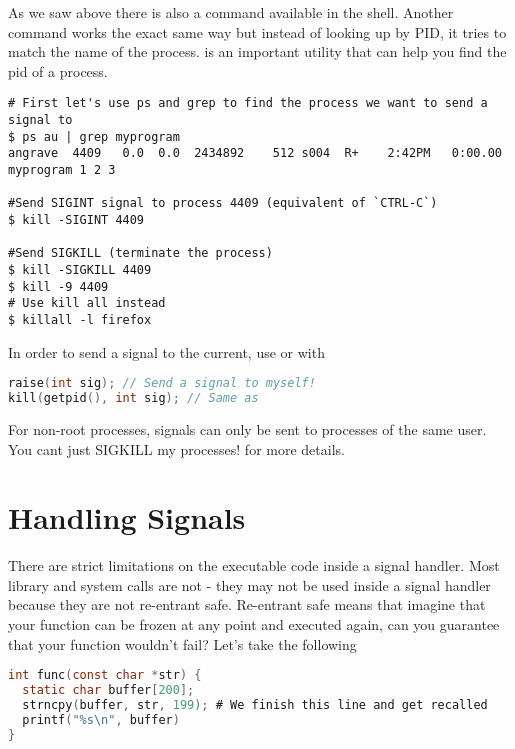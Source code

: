 As we saw above there is also a  command available in the shell. Another command  works the exact same way but instead of looking up by PID, it tries to match the name of the process.  is an important utility that can help you find the pid of a process.

\begin{verbatim}
# First let's use ps and grep to find the process we want to send a signal to
$ ps au | grep myprogram
angrave  4409   0.0  0.0  2434892    512 s004  R+    2:42PM   0:00.00 myprogram 1 2 3

#Send SIGINT signal to process 4409 (equivalent of `CTRL-C`)
$ kill -SIGINT 4409

#Send SIGKILL (terminate the process)
$ kill -SIGKILL 4409
$ kill -9 4409
# Use kill all instead
$ killall -l firefox
\end{verbatim}

In order to send a signal to the current, use  or  with 

\begin{lstlisting}[language=C]
raise(int sig); // Send a signal to myself!
kill(getpid(), int sig); // Same as
\end{lstlisting}

For non-root processes, signals can only be sent to processes of the same user. You cant just SIGKILL my processes!  for more details.


\section{Handling Signals}

There are strict limitations on the executable code inside a signal handler. Most library and system calls are not  - they may not be used inside a signal handler because they are not re-entrant safe. Re-entrant safe means that imagine that your function can be frozen at any point and executed again, can you guarantee that your function wouldn't fail? Let's take the following

\begin{lstlisting}[language=C]
int func(const char *str) {
  static char buffer[200];
  strncpy(buffer, str, 199); # We finish this line and get recalled
  printf("%s\n", buffer)
}
\end{lstlisting}

